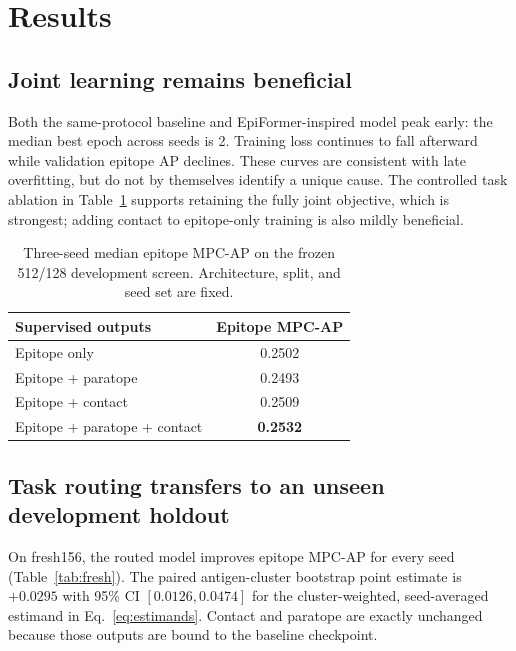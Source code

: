 \documentclass[10pt]{article}
\newcommand{\mpcap}{MPC-AP}
\begin{document}
\section{Results}

\subsection{Joint learning remains beneficial}

Both the same-protocol baseline and EpiFormer-inspired model peak early: the
median best epoch across seeds is 2. Training loss continues to fall afterward
while validation epitope AP declines. These curves are consistent with late
overfitting, but do not by themselves identify a unique cause. The controlled task ablation in
Table~\ref{tab:ablation} supports retaining the fully joint objective, which is
strongest; adding contact to epitope-only training is also mildly beneficial.

\begin{table}[H]
\centering
\caption{Three-seed median epitope \mpcap{} on the frozen 512/128
development screen. Architecture, split, and seed set are fixed.}
\label{tab:ablation}
\small
\begin{tabular}{lc}
\toprule
Supervised outputs & Epitope \mpcap{} \\
\midrule
Epitope only & 0.2502 \\
Epitope + paratope & 0.2493 \\
Epitope + contact & 0.2509 \\
Epitope + paratope + contact & \textbf{0.2532} \\
\bottomrule
\end{tabular}
\end{table}

\subsection{Task routing transfers to an unseen development holdout}

On fresh156, the routed model improves epitope \mpcap{} for every seed
(Table~\ref{tab:fresh}). The paired antigen-cluster bootstrap point estimate is
$+0.0295$ with 95\% CI $[0.0126,0.0474]$ for the cluster-weighted,
seed-averaged estimand in Eq.~\eqref{eq:estimands}. Contact and paratope are
exactly unchanged because those outputs are bound to the baseline checkpoint.
\end{document}
